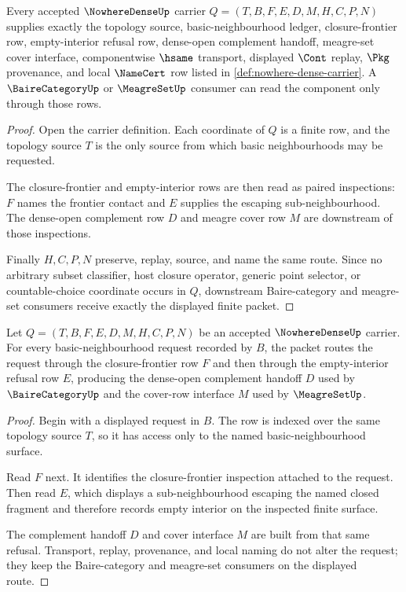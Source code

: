 \begin{theorem}
\label{thm:nowhere-dense-namecert-obligations}
Every accepted $\NowhereDenseUp$ carrier $Q=(T,B,F,E,D,M,H,C,P,N)$ supplies exactly the topology source, basic-neighbourhood ledger, closure-frontier row, empty-interior refusal row, dense-open complement handoff, meagre-set cover interface, componentwise $\hsame$ transport, displayed $\Cont$ replay, $\Pkg$ provenance, and local $\NameCert$ row listed in \autoref{def:nowhere-dense-carrier}. A $\BaireCategoryUp$ or $\MeagreSetUp$ consumer can read the component only through those rows.
\end{theorem}
\begin{proof}
Open the carrier definition. Each coordinate of $Q$ is a finite row, and the topology source $T$ is the only source from which basic neighbourhoods may be requested.

The closure-frontier and empty-interior rows are then read as paired inspections: $F$ names the frontier contact and $E$ supplies the escaping sub-neighbourhood. The dense-open complement row $D$ and meagre cover row $M$ are downstream of those inspections.

Finally $H,C,P,N$ preserve, replay, source, and name the same route. Since no arbitrary subset classifier, host closure operator, generic point selector, or countable-choice coordinate occurs in $Q$, downstream Baire-category and meagre-set consumers receive exactly the displayed finite packet.
\end{proof}

\begin{theorem}
\label{thm:nowhere-dense-closure-interior-refusal}
Let $Q=(T,B,F,E,D,M,H,C,P,N)$ be an accepted $\NowhereDenseUp$ carrier. For every basic-neighbourhood request recorded by $B$, the packet routes the request through the closure-frontier row $F$ and then through the empty-interior refusal row $E$, producing the dense-open complement handoff $D$ used by $\BaireCategoryUp$ and the cover-row interface $M$ used by $\MeagreSetUp$.
\end{theorem}
\begin{proof}
Begin with a displayed request in $B$. The row is indexed over the same topology source $T$, so it has access only to the named basic-neighbourhood surface.

Read $F$ next. It identifies the closure-frontier inspection attached to the request. Then read $E$, which displays a sub-neighbourhood escaping the named closed fragment and therefore records empty interior on the inspected finite surface.

The complement handoff $D$ and cover interface $M$ are built from that same refusal. Transport, replay, provenance, and local naming do not alter the request; they keep the Baire-category and meagre-set consumers on the displayed route.
\end{proof}

